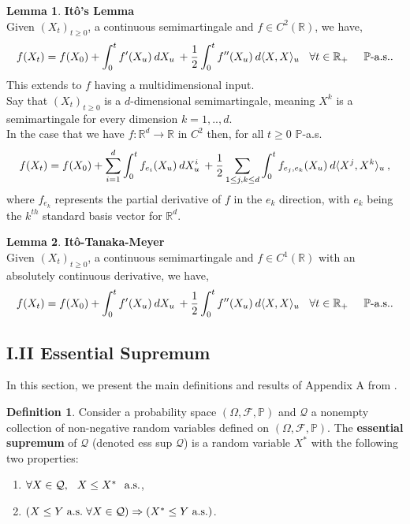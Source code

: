 \documentclass[12pt]{article}
\newcommand{\cF}{\mathcal{F}}
\newcommand{\R}{\mathbb{R}}
\newcommand{\Prb}{\mathbb{P}}
\newcommand{\df}[1]{\hspace{2 px} d #1 \hspace{2 px}}
\newcommand{\PS}{(\Omega, \cF, \Prb)}
\newcommand{\spc}{\hspace{7 px}}
\newcommand{\sspc}{\hspace{3 px}}
\newcommand{\la}{\langle}
\newcommand{\ra}{\rangle}
\newcommand{\als}{\text{a.s.}}
\theoremstyle{definition}
\newtheorem{defn}{Definition}
\newtheorem{lemma}{Lemma}
\begin{document}
\begin{lemma}
    \textbf{Itô's Lemma} \\
    Given $(X_t)_{t \geq 0}$, a continuous semimartingale and $f \in C^2(\R)$, we have,
    \[
        f(X_t) = f(X_0) + \int_0^t f'(X_u) \df{X_u} + \frac{1}{2} \int_0^t f''(X_u) \df{\la X, X \ra_u} \spc
        \forall t \in \R_+ \spc \spc \Prb\text{-}\als.
    \]
    This extends to $f$ having a multidimensional input. \\
    Say that $(X_t)_{t \geq 0}$ is a $d$-dimensional semimartingale, meaning $X^k$ is a semimartingale for every dimension $k=1, .., d$. \\
    In the case that we have $f: \R^d \to \R$ in $C^2$ then, for all $t \geq 0$ $\Prb$-a.s.
    \[
    f(X_t) = f(X_0) + \sum_{i=1}^d \int_0^t f_{e_i}(X_u) \df{X_u^i} + \frac{1}{2} \sum_{1 \leq j, k \leq d} \int_0^t f_{e_j, e_k}(X_u) \df{\la X^j, X^k \ra_u},
    \]
    where $f_{e_k}$ represents the partial derivative of $f$ in the $e_k$ direction, with $e_k$ being the $k^{th}$ standard basis vector for $\R^d$.
\end{lemma}

\begin{lemma}
    \textbf{Itô-Tanaka-Meyer} \\
    Given $(X_t)_{t \geq 0}$, a continuous semimartingale and $f \in C^1(\R)$
    with an absolutely continuous derivative, we have,
    \[
        f(X_t) = f(X_0) + \int_0^t f'(X_u) \df{X_u} + \frac{1}{2} \int_0^t f''(X_u) \df{\la X, X \ra_u} \spc
        \forall t \in \R_+ \spc \spc \Prb\text{-}\als.
    \]
\end{lemma}


\subsection*{\quad I.II Essential Supremum}\label{sec:I.II}

In this section, we present the main definitions and results of Appendix A from \cite{karatzas1998}. \\

\begin{defn}
Consider a probability space $\PS$ and $\mathcal{Q}$ a nonempty collection of non-negative random variables defined on $\PS$.
The \textbf{essential supremum} of $\mathcal{Q}$ (denoted ess sup $\mathcal{Q}$) is a random variable $X^*$ with the following two properties:

\begin{enumerate}
    \item[(i)] $\forall X \in \mathcal{Q}, \spc X \leq X^* \spc \als$,
    \item[(ii)] $(X \leq Y \sspc \als \sspc \forall X \in \mathcal{Q}) \Rightarrow (X^* \leq Y \sspc \als)$.
\end{enumerate}
\end{defn}
\end{document}
